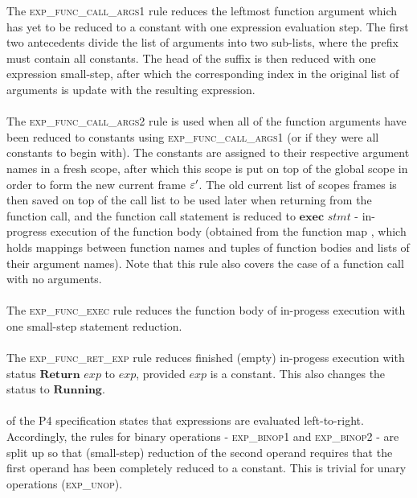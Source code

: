 \documentclass[UTF8]{article}
\begin{document}
The \textsc{exp\_func\_call\_args1} rule reduces the leftmost function argument which has yet to be reduced to a constant with one expression evaluation step. The first two antecedents divide the list of arguments into two sub-lists, where the prefix must contain all constants. The head of the suffix is then reduced with one expression small-step, after which the corresponding index in the original list of arguments is update with the resulting expression.
\\~\\
The \textsc{exp\_func\_call\_args2} rule is used when all of the function arguments have been reduced to constants using \textsc{exp\_func\_call\_args1} (or if they were all constants to begin with). The constants are assigned to their respective argument names in a fresh scope, after which this scope is put on top of the global scope \gscope{} in order to form the new current frame $\varepsilon '$. The old current list of scopes frames \currsf{} is then saved on top of the call list \cstack{} to be used later when returning from the function call, and the function call statement is reduced to $\mathbf{exec} \,\, \mathit{stmt}$ - in-progress execution of the function body \stmt{} (obtained from the function map \fmap{}, which holds mappings between function names \str{} and tuples of function bodies and lists of their argument names). Note that this rule also covers the case of a function call with no arguments.
\\~\\
The \textsc{exp\_func\_exec} rule reduces the function body of in-progess execution with one small-step statement reduction.
\\~\\
The \textsc{exp\_func\_ret\_exp} rule reduces finished (empty) in-progess execution with status $\mathbf{Return} \,\, \mathit{exp}$ to $\mathit{exp}$, provided $\mathit{exp}$ is a constant. This also changes the status to $\mathbf{Running}$.
\\~\\
 of the P4 specification states that expressions are evaluated left-to-right. Accordingly, the rules for binary operations - \textsc{exp\_binop1} and \textsc{exp\_binop2} - are split up so that (small-step) reduction of the second operand requires that the first operand has been completely reduced to a constant. This is trivial for unary operations (\textsc{exp\_unop}).

\newpage
\end{document}
